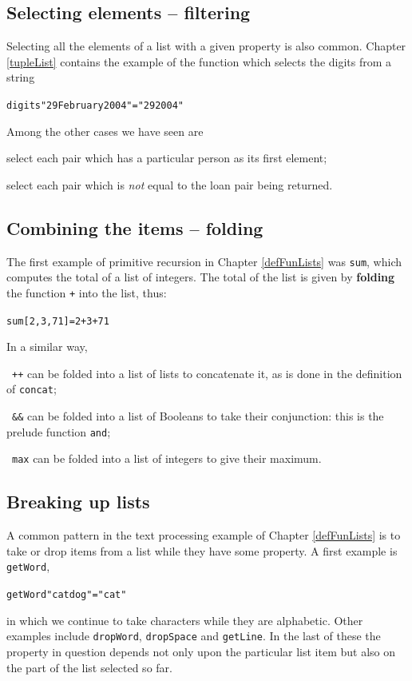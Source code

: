 \subsection*{Selecting elements -- filtering}

Selecting all the elements of a list with a given property is also common.
Chapter \ref{tupleList} contains the example of the function which selects the
digits from a string
\begin{alltt}
digits "29 February 2004" = "292004"
\end{alltt}
Among the other cases we have seen are
\begin{titemize}
\item select each pair which has a particular person as its first element;
\item select each pair which is {\em not\/} equal to the loan pair being
returned.
\end{titemize}

\subsection*{Combining the items -- folding}

The first example of primitive recursion in Chapter \ref{defFunLists} was
\texttt{sum}, 
which computes the total
of a list of integers. The total of the list is given by 
\textbf{folding} the function \texttt{+} into the list, thus:
\begin{alltt}
sum [2,3,71] = 2+3+71
\end{alltt}
In a similar way, 
\begin{titemize}
\item\ \texttt{++} can be folded into a list of lists to concatenate
it, as is done in the definition of \texttt{concat};
\minx{++}
\item\ \texttt{\&\&} can be folded into a list of Booleans to take their
conjunction: this is the prelude function \texttt{and}; 
\item\ \texttt{max} can be folded into a list of integers to give their maximum.
\end{titemize}

\subsection*{Breaking up lists}

A common pattern in the text processing example of Chapter \ref{defFunLists} 
is to take or drop items from a list while they have some property. 
A first example is
\texttt{getWord},
\begin{alltt}
getWord "cat dog" = "cat"
\end{alltt}
in which we continue to take characters while they are alphabetic.
Other examples include \texttt{dropWord}, \texttt{dropSpace} and
\texttt{getLine}. In the last of these
the property in question depends not only upon the particular list item but also on
the part of the list selected so far.

